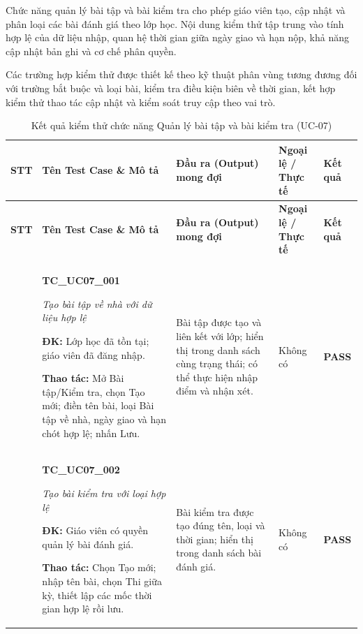 Chức năng quản lý bài tập và bài kiểm tra cho phép giáo viên tạo, cập nhật và phân loại các bài đánh giá theo lớp học. Nội dung kiểm thử tập trung vào tính hợp lệ của dữ liệu nhập, quan hệ thời gian giữa ngày giao và hạn nộp, khả năng cập nhật bản ghi và cơ chế phân quyền.

Các trường hợp kiểm thử được thiết kế theo kỹ thuật phân vùng tương đương đối với trường bắt buộc và loại bài, kiểm tra điều kiện biên về thời gian, kết hợp kiểm thử thao tác cập nhật và kiểm soát truy cập theo vai trò.

\begin{longtable}{|>{\centering\arraybackslash}p{0.8cm}|>{\raggedright\arraybackslash}p{4.6cm}|>{\raggedright\arraybackslash}p{3.8cm}|>{\raggedright\arraybackslash}p{3.8cm}|>{\centering\arraybackslash}p{1.5cm}|}
\caption{Kết quả kiểm thử chức năng Quản lý bài tập và bài kiểm tra (UC-07)}\label{tab:academic-uc07}\\
\hline
\textbf{STT} & \textbf{Tên Test Case \& Mô tả} & \textbf{Đầu ra (Output) mong đợi} & \textbf{Ngoại lệ / Thực tế} & \textbf{Kết quả} \\ \hline
\endfirsthead
\hline
\textbf{STT} & \textbf{Tên Test Case \& Mô tả} & \textbf{Đầu ra (Output) mong đợi} & \textbf{Ngoại lệ / Thực tế} & \textbf{Kết quả} \\ \hline
\endhead
\hline \multicolumn{5}{r}{\scriptsize\itshape Xem tiếp ở trang sau} \\
\endfoot
\hline
\endlastfoot
1 & \textbf{TC\_UC07\_001}\par \textit{Tạo bài tập về nhà với dữ liệu hợp lệ}\par \textbf{ĐK:} Lớp học đã tồn tại; giáo viên đã đăng nhập.\par \textbf{Thao tác:} Mở Bài tập/Kiểm tra, chọn Tạo mới; điền tên bài, loại Bài tập về nhà, ngày giao và hạn chót hợp lệ; nhấn Lưu. & Bài tập được tạo và liên kết với lớp; hiển thị trong danh sách cùng trạng thái; có thể thực hiện nhập điểm và nhận xét. & Không có & \textbf{PASS} \\ \hline
2 & \textbf{TC\_UC07\_002}\par \textit{Tạo bài kiểm tra với loại hợp lệ}\par \textbf{ĐK:} Giáo viên có quyền quản lý bài đánh giá.\par \textbf{Thao tác:} Chọn Tạo mới; nhập tên bài, chọn Thi giữa kỳ, thiết lập các mốc thời gian hợp lệ rồi lưu. & Bài kiểm tra được tạo đúng tên, loại và thời gian; hiển thị trong danh sách bài đánh giá. & Không có & \textbf{PASS} \\ \hline

\end{longtable}
